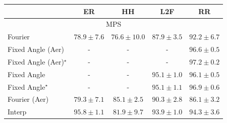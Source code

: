 \begin{tabular}{l|cccc|}
\toprule
            & ER & HH & L2F & RR \\
\midrule
\multicolumn{5}{c}{\rule{0pt}{8pt}MPS} \\
\midrule
Fourier & {\cellcolor[HTML]{FEB340}} \color[HTML]{000000} $78.9\pm 7.6$ & {\cellcolor[HTML]{FEC95B}} \color[HTML]{000000} $76.6\pm 10.0$ & {\cellcolor[HTML]{D65808}} \color[HTML]{F1F1F1} $87.9\pm 3.5$ & {\cellcolor[HTML]{A63A03}} \color[HTML]{F1F1F1} $92.2\pm 6.7$ \\
Fixed Angle (Aer) & {\cellcolor[HTML]{000000}} \color[HTML]{F1F1F1} {\cellcolor{white}} \color{black} - & {\cellcolor[HTML]{000000}} \color[HTML]{F1F1F1} {\cellcolor{white}} \color{black} - & {\cellcolor[HTML]{000000}} \color[HTML]{F1F1F1} {\cellcolor{white}} \color{black} - & {\cellcolor[HTML]{6C2706}} \color[HTML]{F1F1F1} $96.6\pm 0.5$ \\
Fixed Angle (Aer)$^\star$ & {\cellcolor[HTML]{000000}} \color[HTML]{F1F1F1} {\cellcolor{white}} \color{black} - & {\cellcolor[HTML]{000000}} \color[HTML]{F1F1F1} {\cellcolor{white}} \color{black} - & {\cellcolor[HTML]{000000}} \color[HTML]{F1F1F1} {\cellcolor{white}} \color{black} - & {\cellcolor[HTML]{662506}} \color[HTML]{F1F1F1} $97.2\pm 0.2$ \\
Fixed Angle & {\cellcolor[HTML]{000000}} \color[HTML]{F1F1F1} {\cellcolor{white}} \color{black} - & {\cellcolor[HTML]{000000}} \color[HTML]{F1F1F1} {\cellcolor{white}} \color{black} - & {\cellcolor[HTML]{802D05}} \color[HTML]{F1F1F1} $95.1\pm 1.0$ & {\cellcolor[HTML]{732905}} \color[HTML]{F1F1F1} $96.1\pm 0.5$ \\
Fixed Angle$^\star$ & {\cellcolor[HTML]{000000}} \color[HTML]{F1F1F1} {\cellcolor{white}} \color{black} - & {\cellcolor[HTML]{000000}} \color[HTML]{F1F1F1} {\cellcolor{white}} \color{black} - & {\cellcolor[HTML]{802D05}} \color[HTML]{F1F1F1} $95.1\pm 1.1$ & {\cellcolor[HTML]{692606}} \color[HTML]{F1F1F1} $96.9\pm 0.6$ \\
Fourier (Aer) & {\cellcolor[HTML]{FEAF3D}} \color[HTML]{000000} $79.3\pm 7.1$ & {\cellcolor[HTML]{ED7215}} \color[HTML]{F1F1F1} $85.1\pm 2.5$ & {\cellcolor[HTML]{BE4503}} \color[HTML]{F1F1F1} $90.3\pm 2.8$ & {\cellcolor[HTML]{E56910}} \color[HTML]{F1F1F1} $86.1\pm 3.2$ \\
Interp & {\cellcolor[HTML]{782A05}} \color[HTML]{F1F1F1} $95.8\pm 1.1$ & {\cellcolor[HTML]{FB9326}} \color[HTML]{000000} $81.9\pm 9.7$ & {\cellcolor[HTML]{903104}} \color[HTML]{F1F1F1} $93.9\pm 1.0$ & {\cellcolor[HTML]{8B3005}} \color[HTML]{F1F1F1} $94.3\pm 3.6$ \\

\end{tabular}
